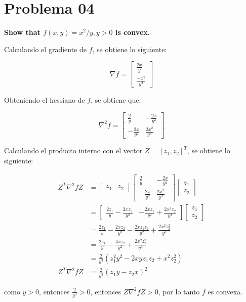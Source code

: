 \section*{Problema 04}

\textbf{Show that $f(x,y)=x^2/y, y>0$ is convex.}

Calculando el gradiente de $f$, se obtiene lo siguiente:

\begin{equation*}
    \nabla f = \begin{bmatrix}
        \frac{2x}{y} \\ \frac{-x^2}{y^2}
    \end{bmatrix}
\end{equation*}

Obteniendo el hessiano de $f$, se obtiene que:

\begin{equation*}
    \nabla^2 f = \begin{bmatrix}
        \frac{2}{y}     & -\frac{2x}{y^2}  \\
        -\frac{2x}{y^2} & \frac{2x^2}{y^3}
    \end{bmatrix}
\end{equation*}

Calculando el producto interno con el vector $Z=[z_1,z_2]^T$, se obtiene lo siguiente:

\begin{align*}
    Z^T \nabla^2 f Z & = \begin{bmatrix}
        z_1 & z_2
    \end{bmatrix}
    \begin{bmatrix}
        \frac{2}{y}     & -\frac{2x}{y^2}  \\
        -\frac{2x}{y^2} & \frac{2x^2}{y^3}
    \end{bmatrix}
    \begin{bmatrix}
        z_1 \\ z_2
    \end{bmatrix}                                                                            \\
                     & = \begin{bmatrix}
        \frac{2z_1}{y} - \frac{2xz_2}{y^2} & -\frac{2xz_1}{y^2} + \frac{2x^2z_2}{y^3}
    \end{bmatrix} \begin{bmatrix}
        z_1 \\ z_2
    \end{bmatrix}                             \\
                     & = \frac{2z_1}{y}- \frac{2xz_2}{y^2} -\frac{2xz_1z_2}{y^2} + \frac{2x^2z_2^2}{y^3} \\
                     & = \frac{2z_1}{y}- \frac{4xz_2}{y^2} + \frac{2x^2z_2^2}{y^3}                       \\
                     & = \frac{2}{y^3} \left ( z_1^2y^2-2xyz_1z_2 + x^2z_2^2\right )                     \\
    Z^T \nabla^2 f Z & = \frac{2}{y^3} \left (z_1y-z_2x\right )^2
\end{align*}

como $y>0$, entonces $\frac{2}{y^3}>0$, entonces $Z\nabla^2f Z > 0$, por lo tanto $f$ es convexa.
